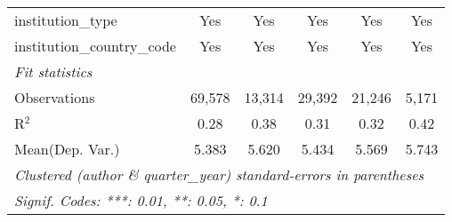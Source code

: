 \begin{tabular}{lccccc}
   institution\_type            & Yes          & Yes           & Yes          & Yes     & Yes\\  
   institution\_country\_code   & Yes          & Yes           & Yes          & Yes     & Yes\\  
   \midrule
   \emph{Fit statistics}\\
   Observations                 & 69,578       & 13,314        & 29,392       & 21,246  & 5,171\\  
   R$^2$                        & 0.28         & 0.38          & 0.31         & 0.32    & 0.42\\  
Mean(Dep. Var.) & 5.383 & 5.620 & 5.434 & 5.569 & 5.743 \\
   \midrule \midrule
   \multicolumn{6}{l}{\emph{Clustered (author \& quarter\_year) standard-errors in parentheses}}\\
   \multicolumn{6}{l}{\emph{Signif. Codes: ***: 0.01, **: 0.05, *: 0.1}}\\
\end{tabular}
\par\endgroup
